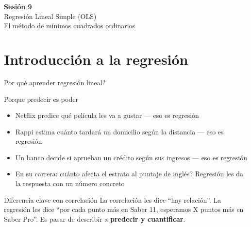 \documentclass[aspectratio=169, 11pt]{beamer}
\begin{document}
\begin{frame}{}
\vfill
\centering
{\Large\textbf{Sesi\'on 9}}\\[1em]
{\normalsize Regresi\'on Lineal Simple (OLS)}\\[0.5em]
{\small El m\'etodo de m\'inimos cuadrados ordinarios}
\vfill
\end{frame}

\section{Introducción a la regresión}

\begin{frame}{\textquestiondown{}Por qu\'e aprender regresi\'on lineal?}
\begin{exampleblock}{Porque predecir es poder}
\small
\begin{itemize}\setlength{\itemsep}{2pt}
  \item Netflix predice qu\'e pel\'icula les va a gustar --- eso es regresi\'on
  \item Rappi estima cu\'anto tardar\'a un domicilio seg\'un la distancia --- eso es regresi\'on
  \item Un banco decide si aprueban un cr\'edito seg\'un sus ingresos --- eso es regresi\'on
  \item En su carrera: \textquestiondown{}cu\'anto afecta el estrato al puntaje de ingl\'es? Regresi\'on les da la respuesta con un n\'umero concreto
\end{itemize}
\end{exampleblock}

\begin{alertblock}{Diferencia clave con correlaci\'on}
\small
La correlaci\'on les dice ``hay relaci\'on''. La regresi\'on les dice ``por cada punto m\'as en Saber 11, esperamos X puntos m\'as en Saber Pro''. Es pasar de describir a \textbf{predecir y cuantificar}.
\end{alertblock}
\end{frame}
\end{document}
